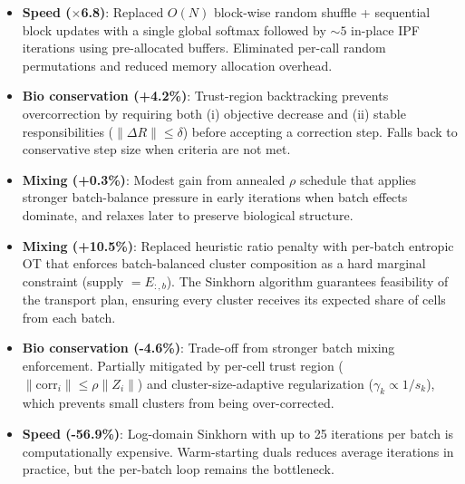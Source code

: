\documentclass[8pt]{article}
\begin{document}
\begin{tcolorbox}[
    title={\textbf{harmony\_272}: Balanced improvement via IPF + trust-region},
    colback=lightgreen!10, colframe=added!60, fonttitle=\small\bfseries,
    boxrule=0.5pt, arc=2pt, left=6pt, right=6pt, top=3pt, bottom=3pt
]
\small
\begin{itemize}[leftmargin=1em, itemsep=2pt]
    \item \textbf{Speed ($\times$6.8)}: Replaced $O(N)$ block-wise random shuffle + sequential block updates with a single global softmax followed by ${\sim}5$ in-place IPF iterations using pre-allocated buffers. Eliminated per-call random permutations and reduced memory allocation overhead.
    \item \textbf{Bio conservation (+4.2\%)}: Trust-region backtracking prevents overcorrection by requiring both (i) objective decrease and (ii) stable responsibilities ($\|\Delta R\| \leq \delta$) before accepting a correction step. Falls back to conservative step size when criteria are not met.
    \item \textbf{Mixing (+0.3\%)}: Modest gain from annealed $\rho$ schedule that applies stronger batch-balance pressure in early iterations when batch effects dominate, and relaxes later to preserve biological structure.
\end{itemize}
\end{tcolorbox}

\vspace{4pt}

\begin{tcolorbox}[
    title={\textbf{harmony\_best\_mixing}: Maximum mixing via entropic optimal transport},
    colback=lightblue!10, colframe=keychange!60, fonttitle=\small\bfseries,
    boxrule=0.5pt, arc=2pt, left=6pt, right=6pt, top=3pt, bottom=3pt
]
\small
\begin{itemize}[leftmargin=1em, itemsep=2pt]
    \item \textbf{Mixing (+10.5\%)}: Replaced heuristic ratio penalty with per-batch entropic OT that enforces batch-balanced cluster composition as a hard marginal constraint (supply $=E_{:,b}$). The Sinkhorn algorithm guarantees feasibility of the transport plan, ensuring every cluster receives its expected share of cells from each batch.
    \item \textbf{Bio conservation (-4.6\%)}: Trade-off from stronger batch mixing enforcement. Partially mitigated by per-cell trust region ($\|\text{corr}_i\| \leq \rho\|Z_i\|$) and cluster-size-adaptive regularization ($\gamma_k \propto 1/s_k$), which prevents small clusters from being over-corrected.
    \item \textbf{Speed (-56.9\%)}: Log-domain Sinkhorn with up to 25 iterations per batch is computationally expensive. Warm-starting duals reduces average iterations in practice, but the per-batch loop remains the bottleneck.
\end{itemize}
\end{tcolorbox}
\end{document}
